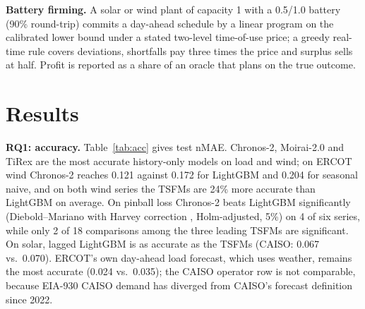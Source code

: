 \documentclass[conference]{IEEEtran}
\begin{document}
\textbf{Battery firming.} A solar or wind plant of capacity 1 with a 0.5/1.0 battery (90\% round-trip) commits a day-ahead schedule by a linear program on the calibrated lower bound under a stated two-level time-of-use price; a greedy real-time rule covers deviations, shortfalls pay three times the price and surplus sells at half. Profit is reported as a share of an oracle that plans on the true outcome.

\section{Results}
\textbf{RQ1: accuracy.} Table~\ref{tab:acc} gives test nMAE. Chronos-2, Moirai-2.0 and TiRex are the most accurate history-only models on load and wind; on ERCOT wind Chronos-2 reaches 0.121 against 0.172 for LightGBM and 0.204 for seasonal naive, and on both wind series the TSFMs are 24\% more accurate than LightGBM on average. On pinball loss Chronos-2 beats LightGBM significantly (Diebold--Mariano with Harvey correction \cite{diebold1995dm,harvey1997hln}, Holm-adjusted, 5\%) on 4 of six series, while only 2 of 18 comparisons among the three leading TSFMs are significant. On solar, lagged LightGBM is as accurate as the TSFMs (CAISO: 0.067 vs.\ 0.070). ERCOT's own day-ahead load forecast, which uses weather, remains the most accurate (0.024 vs.\ 0.035); the CAISO operator row is not comparable, because EIA-930 CAISO demand has diverged from CAISO's forecast definition since 2022.
\end{document}
